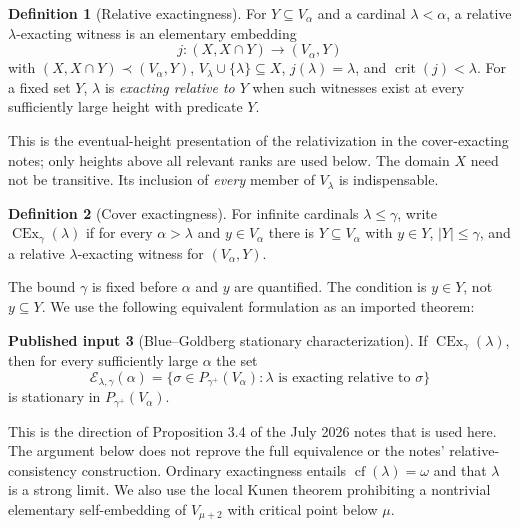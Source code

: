 \documentclass[11pt,letterpaper]{article}
\theoremstyle{definition}
\newtheorem{definition}{Definition}[section]
\newcommand{\CEx}{\operatorname{CEx}}
\newcommand{\crit}{\operatorname{crit}}
\newcommand{\cf}{\operatorname{cf}}
\newcommand{\Cex}[2]{\CEx_{#1}(#2)}
\newtheorem{inputtheorem}[definition]{Published input}
\theoremstyle{remark}
\begin{document}
\begin{definition}[Relative exactingness]\label{def:relative}
For $Y\subseteq V_\alpha$ and a cardinal $\lambda<\alpha$, a relative $\lambda$-exacting witness is an elementary embedding
\[
 j:(X,X\cap Y)\longrightarrow(V_\alpha,Y)
\]
with $(X,X\cap Y)\prec(V_\alpha,Y)$,
$V_\lambda\cup\{\lambda\}\subseteq X$,
$j(\lambda)=\lambda$, and $\crit(j)<\lambda$.
For a fixed set $Y$, $\lambda$ is \emph{exacting relative to $Y$} when such witnesses exist at every sufficiently large height with predicate $Y$.
\end{definition}

This is the eventual-height presentation of the relativization in the cover-exacting notes; only heights above all relevant ranks are used below. The domain $X$ need not be transitive. Its inclusion of \emph{every} member of $V_\lambda$ is indispensable.\cite[Definitions 2.6 and 3.2]{cover}

\begin{definition}[Cover exactingness]\label{def:cover}
For infinite cardinals $\lambda\leq\gamma$, write $\Cex{\gamma}{\lambda}$ if for every $\alpha>\lambda$ and $y\in V_\alpha$ there is $Y\subseteq V_\alpha$ with $y\in Y$, $|Y|\leq\gamma$, and a relative $\lambda$-exacting witness for $(V_\alpha,Y)$.
\end{definition}

The bound $\gamma$ is fixed before $\alpha$ and $y$ are quantified. The condition is $y\in Y$, not $y\subseteq Y$. We use the following equivalent formulation as an imported theorem:

\begin{inputtheorem}[Blue--Goldberg stationary characterization]\label{input:stationary}
If $\Cex{\gamma}{\lambda}$, then for every sufficiently large $\alpha$ the set
\[
 \mathcal E_{\lambda,\gamma}(\alpha)=
 \{\sigma\in P_{\gamma^+}(V_\alpha):
           \lambda\text{ is exacting relative to }\sigma\}
\]
is stationary in $P_{\gamma^+}(V_\alpha)$.
\end{inputtheorem}

This is the direction of Proposition 3.4 of the July 2026 notes that is used here. The argument below does not reprove the full equivalence or the notes' relative-consistency construction. Ordinary exactingness entails $\cf(\lambda)=\omega$ and that $\lambda$ is a strong limit. We also use the local Kunen theorem prohibiting a nontrivial elementary self-embedding of $V_{\mu+2}$ with critical point below $\mu$.\cite{cover,abl,kunen}
\end{document}
